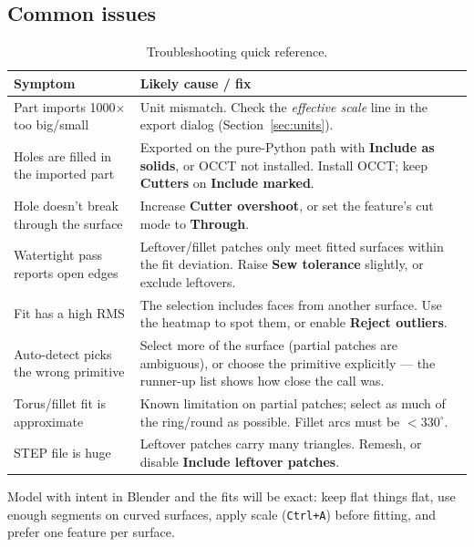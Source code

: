 \documentclass[11pt,a4paper]{article}
\newcommand{\ui}[1]{\textsf{\textbf{#1}}}   %
\begin{document}
\subsection{Common issues}

\begin{table}[h]
\centering
\small
\begin{tabular}{@{}p{5.6cm}p{8.2cm}@{}}
\toprule
\textbf{Symptom} & \textbf{Likely cause / fix} \\
\midrule
Part imports 1000$\times$ too big/small &
  Unit mismatch. Check the \emph{effective scale} line in the export dialog
  (Section~\ref{sec:units}). \\
Holes are filled in the imported part &
  Exported on the pure-Python path with \ui{Include as solids}, or OCCT not
  installed. Install OCCT; keep \ui{Cutters} on \ui{Include marked}. \\
Hole doesn't break through the surface &
  Increase \ui{Cutter overshoot}, or set the feature's cut mode to
  \ui{Through}. \\
Watertight pass reports open edges &
  Leftover/fillet patches only meet fitted surfaces within the fit deviation.
  Raise \ui{Sew tolerance} slightly, or exclude leftovers. \\
Fit has a high RMS &
  The selection includes faces from another surface. Use the heatmap to spot
  them, or enable \ui{Reject outliers}. \\
Auto-detect picks the wrong primitive &
  Select more of the surface (partial patches are ambiguous), or choose the
  primitive explicitly --- the runner-up list shows how close the call was. \\
Torus/fillet fit is approximate &
  Known limitation on partial patches; select as much of the ring/round as
  possible. Fillet arcs must be $<330^\circ$. \\
STEP file is huge &
  Leftover patches carry many triangles. Remesh, or disable \ui{Include
  leftover patches}. \\
\bottomrule
\end{tabular}
\caption{Troubleshooting quick reference.}
\end{table}

\begin{tipbox}
Model with intent in Blender and the fits will be exact: keep flat things
flat, use enough segments on curved surfaces, apply scale
(\texttt{Ctrl+A}) before fitting, and prefer one feature per surface.
\end{tipbox}
\end{document}
